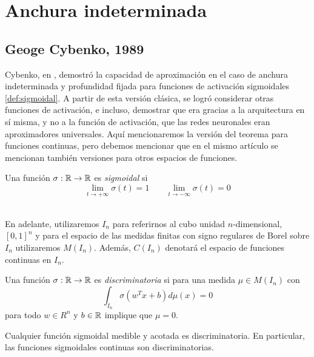 \section{Anchura indeterminada}
\subsection{Geoge Cybenko, 1989}
Cybenko, en \cite{cybenko1989approximation}, demostró la capacidad de aproximación en el caso de anchura indeterminada y profundidad fijada para funciones de activación sigmoidales \autoref{def:sigmoidal}. A partir de esta versión clásica, se logró considerar otras funciones de activación, e incluso, demostrar que era gracias a la arquitectura en sí misma, y no a la función de activación, que las redes neuronales eran aproximadores universales. Aquí mencionaremos la versión del teorema para funciones continuas, pero debemos mencionar que en el mismo artículo se mencionan también versiones para otros espacios de funciones.
\begin{definicion}\label{def:sigmoidal}
Una función $\sigma : \mathbb{R} \to \mathbb{R}$ es \emph{sigmoidal} si $$\lim_{t\to +\infty} \sigma(t)=1 \;\;\;\;\;\;\; \lim_{t\to -\infty} \sigma(t)=0$$
\end{definicion}\\

En adelante, utilizaremos $I_n$ para referirnos al cubo unidad $n$-dimensional, $[0,1]^n$ y para el espacio de las medidas finitas con signo regulares de Borel sobre $I_n$ utilizaremos $M(I_n)$. Además, $C(I_n)$ denotará el espacio de funciones continuas en $I_n$.

\begin{definicion}\label{def:discriminatoria}
Una función $\sigma : \mathbb{R} \to \mathbb{R}$ es \emph{discriminatoria} si para una medida $\mu \in M(I_n)$ con $$\int_{I_n} \sigma(w^Tx+b) d\mu(x)=0$$ para todo $ w\in R^n$ y $b\in\mathbb{R}$ implique que $\mu=0$.
\end{definicion}

\begin{lema}\label{thm:lema-discriminatoria-sigmoidal}
Cualquier función sigmoidal medible y acotada es discriminatoria. En particular, las funciones sigmoidales continuas son discriminatorias.
\end{lema}


